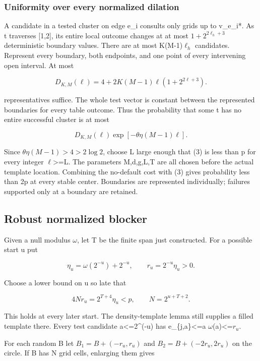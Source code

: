 \documentclass[
  11pt,
]{article}
\theoremstyle{remark}\newtheorem{remark}[theorem]{Remark}
\begin{document}
\subsubsection{Uniformity over every normalized
dilation}\label{uniformity-over-every-normalized-dilation}

A candidate in a tested cluster on edge e\_i consults only grids up to
v\_e\_i*. As t traverses {[}1,2{]}, its entire local outcome changes at
at most \(1+2^{2\ell_h+3}\) deterministic boundary values. There are at
most K(M-1)\(\ell_h\) candidates. Represent every boundary, both
endpoints, and one point of every intervening open interval. At most

\[
D_{K,M}(\ell)=4+2K(M-1)\ell(1+2^{2\ell+3}).
\]

representatives suffice. The whole test vector is constant between the
represented boundaries for every table outcome. Thus the probability
that some t has no entire successful cluster is at most

\[
D_{K,M}(\ell)\exp[-\theta\eta(M-1)\ell].\tag{3}
\]

Since \(\theta\eta(M-1)>4>2\log2\), choose L large enough that (3) is
less than p for every integer \(\ell\)\textgreater=L. The parameters
M,d,g,L,T are all chosen before the actual template location. Combining
the no-default cost with (3) gives probability less than 2p at every
stable center. Boundaries are represented individually; failures
supported only at a boundary are retained.

\subsection{Robust normalized blocker}\label{robust-normalized-blocker}

Given a null modulus \(\omega\), let T be the finite span just
constructed. For a possible start u put

\[
\eta_u=\omega(2^{-u})+2^{-u},\qquad r_u=2^{-u}\eta_u>0.
\]

Choose a lower bound on u so late that

\[
4Nr_u=2^{T+4}\eta_u<p,\qquad N=2^{u+T+2}.
\]

This holds at every later start. The density-template lemma still
supplies a filled template there. Every test candidate
a\textless=2\^{}(-u) has \textbar e\_\{j,a\}\textbar\textless=a
\(\omega\)(a)\textless=\(r_u\).

For each random B let \(B_1=B+(-r_u,r_u)\) and \(B_2=B+(-2r_u,2r_u)\) on
the circle. If B has N grid cells, enlarging them gives
\end{document}
